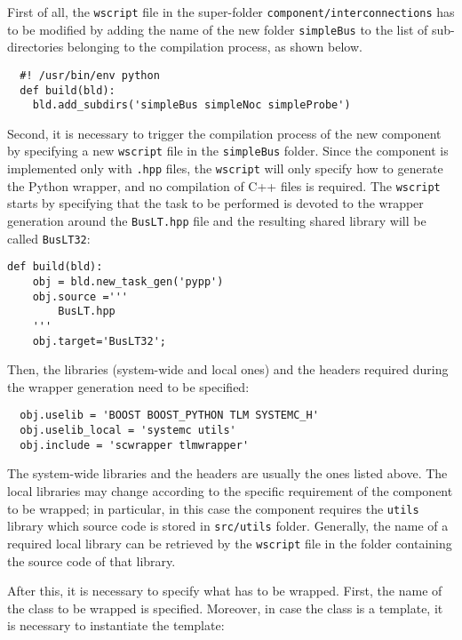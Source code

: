 \indent First of all, the \texttt{wscript} file in the super-folder \texttt{component/interconnections} has to be modified by adding the name of the new folder \texttt{simpleBus} to the list of sub-directories belonging to the compilation process, as shown below. 

\scriptsize
\begin{verbatim}
  #! /usr/bin/env python
  def build(bld):
    bld.add_subdirs('simpleBus simpleNoc simpleProbe')
\end{verbatim}
\normalsize

\indent Second, it is necessary to trigger the compilation process of the new component by specifying a new \texttt{wscript} file in the \texttt{simpleBus} folder. Since the component is implemented only with \texttt{.hpp} files, the \texttt{wscript} will only specify how to generate the Python wrapper, and no compilation of C++ files is required. The \texttt{wscript} starts by specifying that the task to be performed is devoted to the wrapper generation around the \texttt{BusLT.hpp} file and the resulting shared library will be called \texttt{BusLT32}:

\scriptsize
\begin{verbatim}
def build(bld):
    obj = bld.new_task_gen('pypp')
    obj.source ='''
        BusLT.hpp
    '''
    obj.target='BusLT32';
\end{verbatim}
\normalsize

\indent Then, the libraries (system-wide and local ones) and the headers required during the wrapper generation need to be specified:

\scriptsize
\begin{verbatim}
  obj.uselib = 'BOOST BOOST_PYTHON TLM SYSTEMC_H'
  obj.uselib_local = 'systemc utils'
  obj.include = 'scwrapper tlmwrapper'
\end{verbatim}
\normalsize

\indent The system-wide libraries and the headers are usually the ones listed above. The local libraries may change according to the specific requirement of the component to be wrapped; in particular, in this case the component requires the \texttt{utils} library which source code is stored in \texttt{src/utils} folder. Generally, the name of a required local library can be retrieved by the \texttt{wscript} file in the folder containing the source code of that library.

\indent After this, it is necessary to specify what has to be wrapped. First, the name of the class to be wrapped is specified. Moreover, in case the class is a template, it is necessary to instantiate the template:

